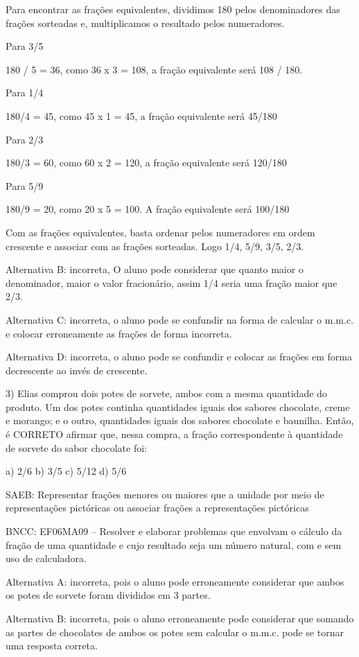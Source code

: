 Para encontrar as frações equivalentes, dividimos 180 pelos
denominadores das frações sorteadas e, multiplicamos o resultado pelos
numeradores.

Para 3/5

180 / 5 = 36, como 36 x 3 = 108, a fração equivalente será 108 / 180.

Para 1/4

180/4 = 45, como 45 x 1 = 45, a fração equivalente será 45/180

Para 2/3

180/3 = 60, como 60 x 2 = 120, a fração equivalente será 120/180

Para 5/9

180/9 = 20, como 20 x 5 = 100. A fração equivalente será 100/180

Com as frações equivalentes, basta ordenar pelos numeradores em ordem
crescente e associar com as frações sorteadas. Logo 1/4, 5/9, 3/5, 2/3.

Alternativa B: incorreta, O aluno pode considerar que quanto maior o
denominador, maior o valor fracionário, assim 1/4 seria uma fração maior
que 2/3.

Alternativa C: incorreta, o aluno pode se confundir na forma de calcular
o m.m.c. e colocar erroneamente as frações de forma incorreta.

Alternativa D: incorreta, o aluno pode se confundir e colocar as frações
em forma decrescente ao invés de crescente.

3) Elias comprou dois potes de sorvete, ambos com a mesma quantidade do
produto. Um dos potes continha quantidades iguais dos sabores chocolate,
creme e morango; e o outro, quantidades iguais dos sabores chocolate e
baunilha. Então, é CORRETO afirmar que, nessa compra, a fração
correspondente à quantidade de sorvete do sabor chocolate foi:

a) 2/6 b) 3/5 c) 5/12 d) 5/6

SAEB: Representar frações menores ou maiores que a unidade por meio de
representações pictóricas ou associar frações a representações
pictóricas

BNCC: EF06MA09 -- Resolver e elaborar problemas que envolvam o cálculo
da fração de uma quantidade e cujo resultado seja um número natural, com
e sem uso de calculadora.

Alternativa A: incorreta, pois o aluno pode erroneamente considerar que
ambos os potes de sorvete foram divididos em 3 partes.

Alternativa B: incorreta, pois o aluno erroneamente pode considerar que
somando as partes de chocolates de ambos os potes sem calcular o m.m.c.
pode se tornar uma resposta correta.

